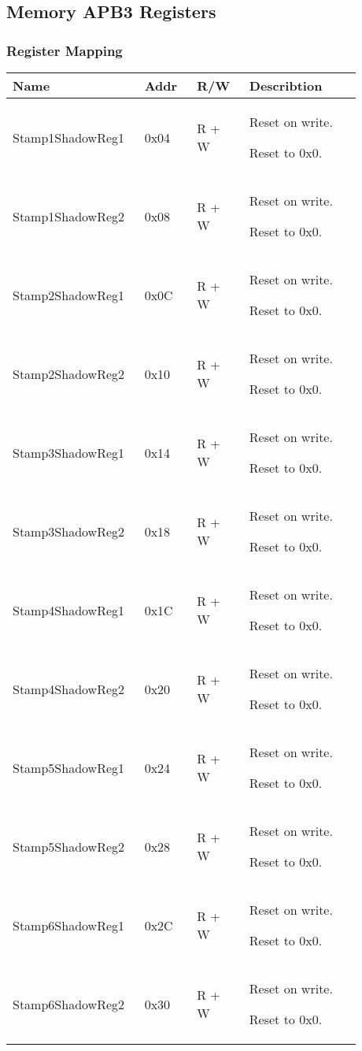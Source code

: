 \subsection{Memory APB3 Registers}
\subsubsection{Register Mapping}
\label{sec:apbRegDec}
\renewcommand{\arraystretch}{1.5}
\begin{longtable} [htb] { |p{0.3\linewidth}|p{0.14\linewidth}|p{0.14\linewidth}|p{0.3\linewidth}| } \hline
	\label{tab:table3}
	\textbf{Name} & \textbf{Addr}& \textbf{R/W}&\textbf{Describtion}\\
	\hline
	Stamp1ShadowReg1&0x04&R + W& Reset on write. \par Reset to 0x0.\\
	\hline
	Stamp1ShadowReg2&0x08&R + W& Reset on write. \par Reset to 0x0.\\
	\hline
	Stamp2ShadowReg1&0x0C&R + W& Reset on write. \par Reset to 0x0.\\
	\hline
	Stamp2ShadowReg2&0x10&R + W& Reset on write. \par Reset to 0x0.\\
	\hline
	Stamp3ShadowReg1&0x14&R + W& Reset on write. \par Reset to 0x0.\\
	\hline
	Stamp3ShadowReg2&0x18&R + W& Reset on write. \par Reset to 0x0.\\
	\hline
	Stamp4ShadowReg1&0x1C&R + W& Reset on write. \par Reset to 0x0.\\
	\hline
	Stamp4ShadowReg2&0x20&R + W& Reset on write. \par Reset to 0x0.\\
	\hline
	Stamp5ShadowReg1&0x24&R + W& Reset on write. \par Reset to 0x0.\\
	\hline
	Stamp5ShadowReg2&0x28&R + W& Reset on write. \par Reset to 0x0.\\
	\hline
	Stamp6ShadowReg1&0x2C&R + W& Reset on write. \par Reset to 0x0. \\
	\hline
	Stamp6ShadowReg2&0x30&R + W& Reset on write. \par Reset to 0x0.\\
	\hline

\end{longtable}
